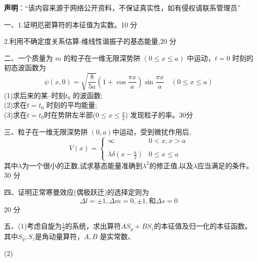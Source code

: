 
\textbf{声明}：“该内容来源于网络公开资料，不保证真实性，如有侵权请联系管理员”

一、1.证明厄密算符的本征值为实数。10 分

2.利用不确定度关系估算-维线性谐振子的基态能量,20 分

二、一个质量为 $m$ 的粒子在一维无限深势阱 $ (0 \leq x \leq a) $ 中运动，$t = 0$ 时刻的初态波函数为
$$\psi(x, 0) = \sqrt{\frac{8}{5a}} (1 + \cos \frac{\pi x}{a}) \sin \frac{\pi x}{a} \quad (0 \leq x \leq a)~$$ 
(1)求后来的某--时刻$t_0$ 的波函数;\\
(2)求在$t=t_0$ 时刻的平均能量;\\
(3)求在$t=t_0$时在势阱左半部($0\leq  x \leq \frac{a}{2}$) 发现粒子的率。30分

三、粒子在一维无限深势阱 $(0,a)$中运动，受到微扰作用后,
$$V(x) = \begin{cases} \infty & 0 < x, x > a \\\\ \lambda \delta \left( x - \frac{a}{2} \right) & 0 \leq x \leq a \end{cases}~$$
其中$\lambda$为一个很小的正数,试求基态能量准确到$\lambda^2$的修正值,以及$\lambda$应当满足的条件。30 分

四、证明正常寒曼效应(偶极跃迁)的选择定则为
$$\Delta l = \pm 1, \Delta m = 0, \pm 1,\text{和} \Delta s = 0~$$
20 分

五、(1)考虑自旋为$\frac{1}{2}$的系统，求出算符$AS_{y}+BS_{z}$的本征值及归一化的本征函数。其中$S_y,S_z$是角动量算符，$A,B$ 是实常数、

(2)